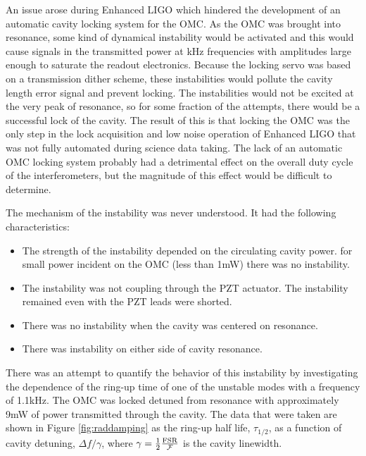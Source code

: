 An issue arose during Enhanced LIGO which hindered the development of an automatic cavity locking system for the OMC. %
As the OMC was brought into resonance, some kind of dynamical instability would be activated and this would cause signals in the transmitted power at kHz frequencies with amplitudes large enough to saturate the readout electronics. %
Because the locking servo was based on a transmission dither scheme, these instabilities would pollute the cavity length error signal and prevent locking. %
The instabilities would not be excited at the very peak of resonance, so for some fraction of the attempts, there would be a successful lock of the cavity. %
The result of this is that locking the OMC was the only step in the lock acquisition and low noise operation of Enhanced LIGO that was not fully automated during science data taking. %
The lack of an automatic OMC locking system probably had a detrimental effect on the overall duty cycle of the interferometers, but the magnitude of this effect would be difficult to determine.

The mechanism of the instability was never understood. %
It had the following characteristics:
\begin{itemize}
\item The strength of the instability depended on the circulating cavity power. for small power incident on the OMC (less than 1mW) there was no instability.
\item The instability was not coupling through the PZT actuator. The instability remained even with the PZT leads were shorted.
\item There was no instability when the cavity was centered on resonance.
\item There was instability on either side of cavity resonance.
\end{itemize}

There was an attempt to quantify the behavior of this instability by investigating the dependence of the ring-up time of one of the unstable modes with a frequency of 1.1kHz. %
The OMC was locked detuned from resonance with approximately 9mW of power transmitted through the cavity. %
The data that were taken are shown in Figure \ref{fig:raddamping} as the ring-up half life, $\tau_{1/2}$, as a function of cavity detuning, $\Delta f/\gamma$, where $\gamma= \frac{1}{2}\frac{\rm{FSR}}{\mathcal{F}}$ is the cavity linewidth.

